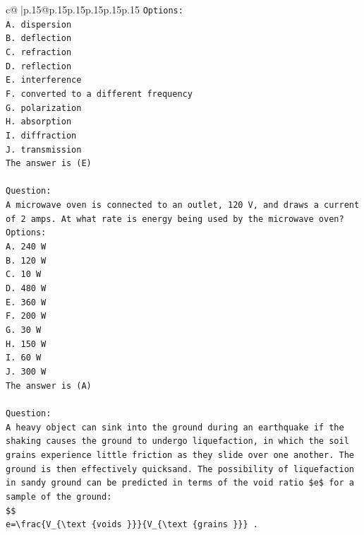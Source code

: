 \documentclass{article}
\begin{document}
{\begin{supertabular}{c@{$\;$}|p{.15\linewidth}@{}p{.15\linewidth}p{.15\linewidth}p{.15\linewidth}p{.15\linewidth}p{.15\linewidth}}
{{{\texttt{Options:} \\
\texttt{A. dispersion} \\
\texttt{B. deflection} \\
\texttt{C. refraction} \\
\texttt{D. reflection} \\
\texttt{E. interference} \\
\texttt{F. converted to a different frequency} \\
\texttt{G. polarization} \\
\texttt{H. absorption} \\
\texttt{I. diffraction} \\
\texttt{J. transmission} \\
\texttt{The answer is (E)} \\
\\ 
\texttt{Question:} \\
\texttt{A microwave oven is connected to an outlet, 120 V, and draws a current of 2 amps. At what rate is energy being used by the microwave oven?} \\
\texttt{Options:} \\
\texttt{A. 240 W} \\
\texttt{B. 120 W} \\
\texttt{C. 10 W} \\
\texttt{D. 480 W} \\
\texttt{E. 360 W} \\
\texttt{F. 200 W} \\
\texttt{G. 30 W} \\
\texttt{H. 150 W} \\
\texttt{I. 60 W} \\
\texttt{J. 300 W} \\
\texttt{The answer is (A)} \\
\\ 
\texttt{Question:} \\
\texttt{A heavy object can sink into the ground during an earthquake if the shaking causes the ground to undergo liquefaction, in which the soil grains experience little friction as they slide over one another. The ground is then effectively quicksand. The possibility of liquefaction in sandy ground can be predicted in terms of the void ratio \$e\$ for a sample of the ground:} \\
\texttt{\$\$} \\
\texttt{e=\textbackslash{}frac\{V\_\{\textbackslash{}text \{voids \}\}\}\{V\_\{\textbackslash{}text \{grains \}\}\} .} \\
}}}
\end{supertabular}}
\end{document}
